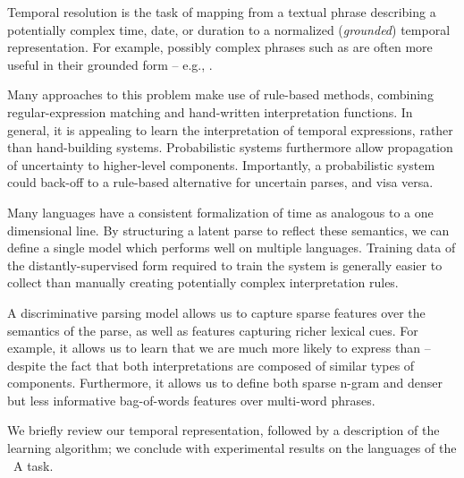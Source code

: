 Temporal resolution is the task of mapping from a textual phrase describing
	a potentially complex time, date, or duration to a normalized
	(\textit{grounded}) temporal representation.
For example, possibly complex phrases such as  are
	often more useful in their grounded form -- e.g., .

Many approaches to this problem make use of rule-based methods, combining
  regular-expression matching and hand-written interpretation functions.
In general, it is appealing to learn the interpretation of temporal expressions,
	rather than hand-building systems.
Probabilistic systems furthermore allow propagation of uncertainty
	to higher-level components.
Importantly, a probabilistic system could back-off to a rule-based alternative
  for uncertain parses, and visa versa.

Many languages have a consistent formalization of time as
  analogous to a one dimensional line.
By structuring a latent parse to reflect these semantics, we can define a single
  model which performs well on multiple languages.
Training data of the distantly-supervised form required to train the system
  is generally easier to collect than manually creating potentially complex
  interpretation rules.

A discriminative parsing model allows us to capture sparse features over
  the semantics of the parse, as well as features capturing richer lexical cues.
For example, it allows us to learn that we are much more likely to
  express  than  -- despite the fact that
  both interpretations are composed of similar types of components.
Furthermore, it allows us to define both sparse n-gram and denser but less
  informative bag-of-words features over multi-word phrases.

We briefly review our temporal representation,
	followed by a description of the learning algorithm; 
	we conclude with experimental results on the languages of the
  \tempeval\ A task.



